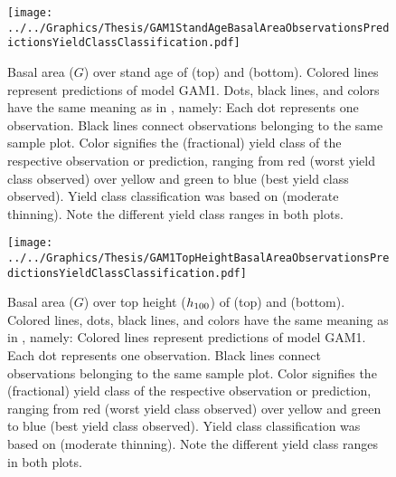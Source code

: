 \begin{figure}[h]
  \centering
  \texttt{[image: ../../Graphics/Thesis/GAM1StandAgeBasalAreaObservationsPredictionsYieldClassClassification.pdf]}
  \caption{Basal area (\(G\)) over stand age of \Beech{} (top) and \Spruce{} (bottom).  Colored lines represent predictions of model GAM1.  Dots, black lines, and colors have the same meaning as in , namely:  Each dot represents one observation.  Black lines connect observations belonging to the same sample plot.  Color signifies the (fractional) yield class of the respective observation or prediction, ranging from red (worst yield class observed) over yellow and green to blue (best yield class observed). Yield class classification was based on \textcite{Schober1995} (moderate thinning).  Note the different yield class ranges in both plots.}
  \label{fig:GAM1StandAgeBasalAreaObservationsPredictionsYieldClassClassification}
\end{figure}

\begin{figure}[h]
  \centering
  \texttt{[image: ../../Graphics/Thesis/GAM1TopHeightBasalAreaObservationsPredictionsYieldClassClassification.pdf]}
  \caption{Basal area (\(G\)) over top height (\(h_{100}{}\)) of \Beech{} (top) and \Spruce{} (bottom).  Colored lines, dots, black lines, and colors have the same meaning as in , namely:  Colored lines represent predictions of model GAM1.  Each dot represents one observation.  Black lines connect observations belonging to the same sample plot.  Color signifies the (fractional) yield class of the respective observation or prediction, ranging from red (worst yield class observed) over yellow and green to blue (best yield class observed). Yield class classification was based on \textcite{Schober1995} (moderate thinning).  Note the different yield class ranges in both plots.}
  \label{fig:GAM1TopHeightBasalAreaObservationsPredictionsYieldClassClassification}
\end{figure}


\clearpage{}

